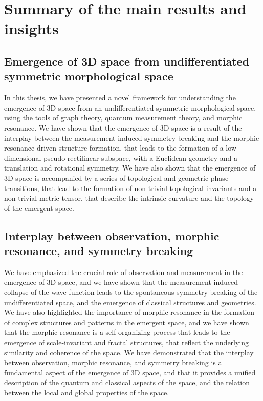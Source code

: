 
\section{Summary of the main results and insights}
\subsection{Emergence of 3D space from undifferentiated symmetric morphological space}
In this thesis, we have presented a novel framework for understanding the emergence of 3D space from an undifferentiated symmetric morphological space, using the tools of graph theory, quantum measurement theory, and morphic resonance. We have shown that the emergence of 3D space is a result of the interplay between the measurement-induced symmetry breaking and the morphic resonance-driven structure formation, that leads to the formation of a low-dimensional pseudo-rectilinear subspace, with a Euclidean geometry and a translation and rotational symmetry. We have also shown that the emergence of 3D space is accompanied by a series of topological and geometric phase transitions, that lead to the formation of non-trivial topological invariants and a non-trivial metric tensor, that describe the intrinsic curvature and the topology of the emergent space.

\subsection{Interplay between observation, morphic resonance, and symmetry breaking}
We have emphasized the crucial role of observation and measurement in the emergence of 3D space, and we have shown that the measurement-induced collapse of the wave function leads to the spontaneous symmetry breaking of the undifferentiated space, and the emergence of classical structures and geometries. We have also highlighted the importance of morphic resonance in the formation of complex structures and patterns in the emergent space, and we have shown that the morphic resonance is a self-organizing process that leads to the emergence of scale-invariant and fractal structures, that reflect the underlying similarity and coherence of the space. We have demonstrated that the interplay between observation, morphic resonance, and symmetry breaking is a fundamental aspect of the emergence of 3D space, and that it provides a unified description of the quantum and classical aspects of the space, and the relation between the local and global properties of the space.

